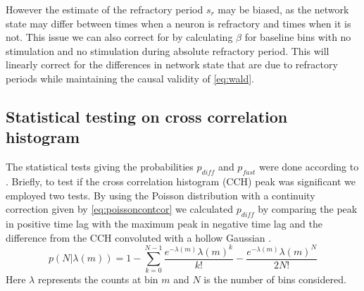 \documentclass[11pt]{article}
\begin{document}
However the estimate of the refractory period $ s_r $ may be biased, as the network state may differ between times when a neuron is refractory and times when it is not. This issue we can also correct for by calculating $ \beta $ for baseline bins with no stimulation and no stimulation during absolute refractory period. This will linearly correct for the differences in network state that are due to refractory periods while maintaining the causal validity of \cref{eq:wald}.


\subsection{Statistical testing on cross correlation histogram}
The statistical tests giving the probabilities $ p_{diff} $ and $ p_{fast} $ were done according to \cite{Stark2009, English2017}. Briefly, to test if the cross correlation histogram (CCH) peak was significant we employed two tests. By using the Poisson distribution with a continuity correction \cite{Stark2009} given by \cref{eq:poissoncontcor} we calculated $ p_{diff} $ by comparing the peak in positive time lag with the maximum peak in negative time lag \cite{English2017} and the difference from the CCH convoluted with a hollow Gaussian \cite{Stark2009}.
\begin{equation}
p(N|\lambda(m)) = 1 - \sum_{k=0}^{N-1}\frac{e^{-\lambda(m)}\lambda(m)^k}{k!} - \frac{e^{-\lambda(m)}\lambda(m)^N}{2N!}
\label{eq:poissoncontcor}
\end{equation}
Here $ \lambda $ represents the counts at bin $ m $ and $ N $ is the number of bins considered.
\end{document}
